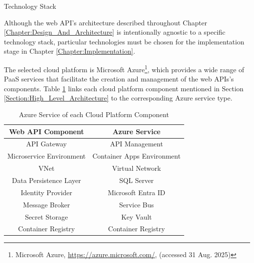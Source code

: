 \documentclass[12pt, reqno]{amsbook}
\makeatletter
\def\section{\@startsection{section}{1}%
      \z@{.5\linespacing\@plus.7\linespacing}{.25\linespacing}%
      {\normalfont\bfseries\flushleft}}
\theoremstyle{definition}
\theoremstyle{definition}
\numberwithin{section}{chapter}
\numberwithin{table}{chapter}
\numberwithin{figure}{chapter}
\makeatother
\begin{document}
\section{Technology Stack}
\label{Section:Technology_Stack}

Although the web \ac{API}'s architecture described throughout Chapter \ref{Chapter:Design_And_Architecture} is intentionally agnostic to a specific technology stack, particular technologies must be chosen for the implementation stage in Chapter \ref{Chapter:Implementation}.

The selected cloud platform is Microsoft Azure\footnote{Microsoft Azure, \url{https://azure.microsoft.com/}, (accessed 31 Aug. 2025)}, which provides a wide range of \ac{PaaS} services that facilitate the creation and management of the web \acp{API}'s components. Table \ref{Table:AzureServiceMapping} links each cloud platform component mentioned in Section \ref{Section:High_Level_Architecture} to the corresponding Azure service type.

\begin{table}[h!]
  \centering
  \begin{tabular}{|c|c|}
    \hline
    \multicolumn{1}{|c|}{\textbf{Web \ac{API} Component}} & \multicolumn{1}{c|}{\textbf{Azure Service}} \\
    \hline
    \ac{API} Gateway                                      & API Management                              \\
    \hline
    Microservice Environment                              & Container Apps Environment                  \\
    \hline
    \ac{VNet}                                             & Virtual Network                             \\
    \hline
    Data Persistence Layer                                & SQL Server                                  \\
    \hline
    Identity Provider                                     & Microsoft Entra ID                          \\
    \hline
    Message Broker                                        & Service Bus                                 \\
    \hline
    Secret Storage                                        & Key Vault                                   \\
    \hline
    Container Registry                                    & Container Registry                          \\
    \hline
  \end{tabular}
  \vspace{10pt}
  \caption{Azure Service of each Cloud Platform Component}
  \label{Table:AzureServiceMapping}
\end{table}
\end{document}
